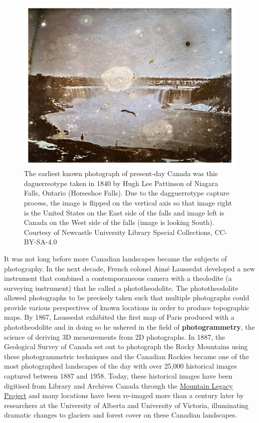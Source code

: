 \documentclass[
]{book}
\begin{document}
\begin{figure}
\includegraphics[width=0.75\linewidth]{images/01-niagara-falls-daguerreotype-1840} \caption{The earliest known photograph of present-day Canada was this daguerreotype taken in 1840 by Hugh Lee Pattinson of Niagara Falls, Ontario (Horseshoe Falls). Due to the dagguerrotype capture process, the image is flipped on the vertical axis so that image right is the United States on the East side of the falls and image left is Canada on the West side of the falls (image is looking South). Courtesy of Newcastle University Library Special Collections, CC-BY-SA-4.0}\label{fig:1-niagara-falls-daguerreotype-1840}
\end{figure}

It was not long before more Canadian landscapes became the subjects of photography. In the next decade, French colonel Aimé Laussedat developed a new instrument that combined a contemporaneous camera with a theolodite (a surveying instrument) that he called a phototheodolite. The phototheodolite allowed photographs to be precisely taken such that multiple photographs could provide various perspectives of known locations in order to produce topographic maps. By 1867, Laussedat exhibited the first map of Paris produced with a phototheodolite and in doing so he ushered in the field of \textbf{photogrammetry}, the science of deriving 3D measurements from 2D photographs. In 1887, the Geological Survey of Canada set out to photograph the Rocky Mountains using these photogrammetric techniques and the Canadian Rockies became one of the most photographed landscapes of the day with over 25,000 historical images captured between 1887 and 1958. Today, these historical images have been digitised from Library and Archives Canada through the \href{http://mountainlegacy.ca/}{Mountain Legacy Project} and many locations have been re-imaged more than a century later by researchers at the University of Alberta and University of Victoria, illuminating dramatic changes to glaciers and forest cover on these Canadian landscapes.
\end{document}
